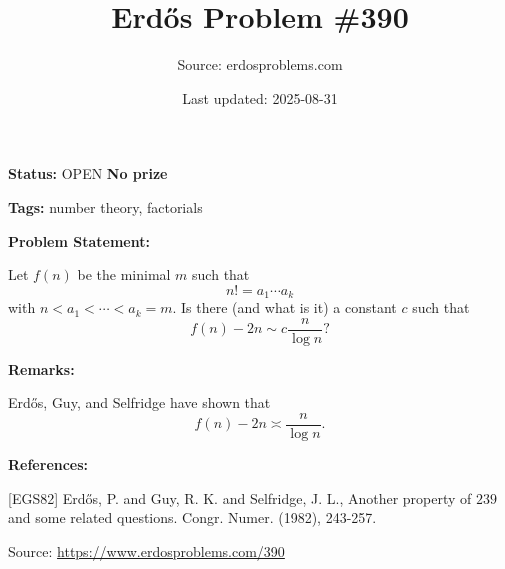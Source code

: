 \documentclass{article}
\title{Erd\H{o}s Problem \#390}
\date{Last updated: 2025-08-31}
\author{Source: erdosproblems.com}
\begin{document}
\maketitle

\noindent\textbf{Status:} OPEN \quad \textbf{No prize}

\noindent\textbf{Tags:} number theory, factorials

\medskip
\noindent\textbf{Problem Statement:}

Let $f(n)$ be the minimal $m$ such that\[n! = a_1\cdots a_k\]with $n< a_1<\cdots <a_k=m$. Is there (and what is it) a constant $c$ such that\[f(n)-2n \sim c\frac{n}{\log n}?\]

\bigskip
\noindent\textbf{Remarks:}

Erd\H{o}s, Guy, and Selfridge \cite{EGS82} have shown that\[f(n)-2n \asymp \frac{n}{\log n}.\]

\bigskip
\noindent\textbf{References:}

[EGS82] Erd\H{o}s, P. and Guy, R. K. and Selfridge, J. L., Another property of {$239$} and some related questions. Congr. Numer. (1982), 243-257.

\bigskip
\noindent\small{Source: \url{https://www.erdosproblems.com/390}}
\end{document}
